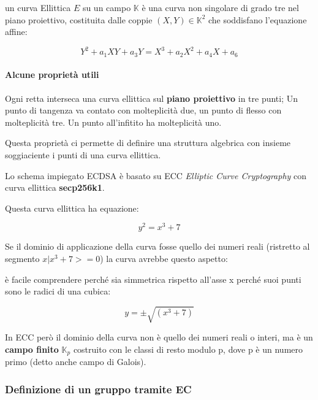 \documentclass{book}
\theoremstyle{definition}
\begin{document}
un curva Ellittica $E$ su un campo $\mathbb{K}$ è una curva non singolare di grado tre nel piano proiettivo, costituita dalle coppie
$(X, Y) \in \mathbb{K}^{2}$ che soddisfano l'equazione affine:

\begin{equation}
    \label{WeierstrassGenealized}
    Y^{2} + a_{1} X Y + a_{3} Y = X^{3} + a_{2} X^{2} + a_{4}X + a_{6}
\end{equation}

\paragraph{Alcune proprietà utili}

Ogni retta interseca una curva ellittica sul \textbf{piano proiettivo} in tre punti; 
Un punto di tangenza va contato con molteplicità due, un punto di flesso con molteplicità tre.
Un punto all'infitito ha molteplicità uno.

Questa proprietà ci permette di definire una struttura algebrica con insieme soggiaciente i punti di una curva ellittica.

Lo schema impiegato ECDSA è basato su ECC \textit{Elliptic Curve Cryptography} con curva ellittica \textbf{secp256k1}.

Questa curva ellittica ha equazione:

\begin{equation}
    y^2 = x^3 + 7
\end{equation}

Se il dominio di applicazione della curva fosse quello dei numeri reali (ristretto al segmento $x | x^3 + 7 >= 0$) la curva avrebbe questo aspetto:


è facile comprendere perché sia simmetrica rispetto all'asse x perché suoi punti sono le radici di una cubica:

\begin{equation*}
    y = \pm \sqrt{(x^3+7)}
\end{equation*}

In ECC però il dominio della curva non è quello dei numeri reali o interi, ma è un \textbf{campo finito} $\mathbb{K}_{p}$ costruito con le classi di resto modulo p, dove p è un numero primo (detto anche campo di Galois).

\subsubsection{Definizione di un gruppo tramite EC}
\end{document}
